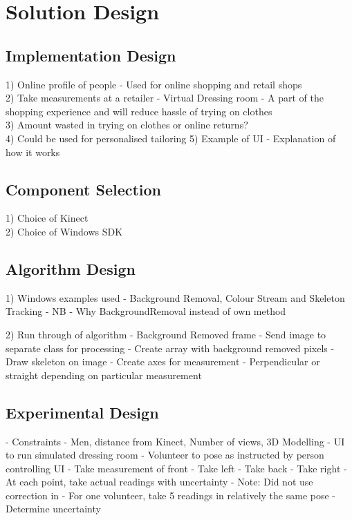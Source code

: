 \chapter{Solution Design}

\section{Implementation Design}
1) Online profile of people - Used for online shopping and retail shops\\
2) Take measurements at a retailer - Virtual Dressing room - A part of the shopping experience and will reduce hassle of trying on clothes\\
3) Amount wasted in trying on clothes or online returns?\\
4) Could be used for personalised tailoring
5) Example of UI - Explanation of how it works

\section{Component Selection}
1) Choice of Kinect\\
2) Choice of Windows SDK\\

\section{Algorithm Design}
1) Windows examples used - Background Removal, Colour Stream and Skeleton Tracking - NB - Why BackgroundRemoval instead of own method

2) Run through of algorithm
- Background Removed frame
- Send image to separate class for processing
- Create array with background removed pixels
- Draw skeleton on image
- Create axes for measurement - Perpendicular or straight depending on particular measurement

\section{Experimental Design}
- Constraints - Men, distance from Kinect, Number of views, 3D Modelling
- UI to run simulated dressing room
- Volunteer to pose as instructed by person controlling UI
- Take measurement of front
- Take left
- Take back
- Take right 
- At each point, take actual readings with uncertainty
- Note: Did not use correction in \cite{nonContact2017}
- For one volunteer, take 5 readings in relatively the same pose - Determine uncertainty 